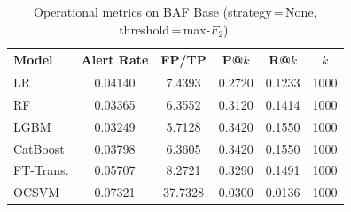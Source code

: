 \begin{table}[ht!]
\centering
\caption{Operational metrics on BAF Base (strategy\,=\,None, threshold\,=\,max-$F_2$).}
\label{tab:ops_baf}
\begin{tabular}{l c c c c c}
\toprule
Model & Alert Rate & FP/TP & P@$k$ & R@$k$ & $k$ \\
\midrule
LR         & 0.04140 & 7.4393 & 0.2720 & 0.1233 & 1000 \\
RF         & 0.03365 & 6.3552 & 0.3120 & 0.1414 & 1000 \\
LGBM       & 0.03249 & 5.7128 & 0.3420 & 0.1550 & 1000 \\
CatBoost   & 0.03798 & 6.3605 & 0.3420 & 0.1550 & 1000 \\
FT-Trans.  & 0.05707 & 8.2721 & 0.3290 & 0.1491 & 1000 \\
OCSVM      & 0.07321 & 37.7328 & 0.0300 & 0.0136 & 1000 \\
\bottomrule
\end{tabular}
\end{table}
